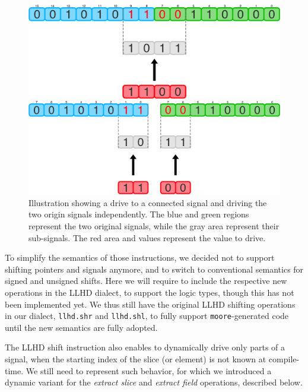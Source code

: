 \begin{figure}[ht]
    \centering
    \begin{minipage}{0.49\textwidth}
        \includegraphics[width=\textwidth]{gfx/DrvConn.png}
    \end{minipage}
    \hfill
    \begin{minipage}{0.49\textwidth}
        \includegraphics[width=\textwidth]{gfx/DrvSplit.png}
    \end{minipage}
    \caption[Driving a connected signal vs. driving the two origin signals independently.]{Illustration showing a drive to a connected signal and driving the two origin signals independently. The blue and green regions represent the two original signals, while the gray area represent their sub-signals. The red area and values represent the value to drive.}
    \label{fig:drvconn}
\end{figure}

To simplify the semantics of those instructions, we decided not to support shifting pointers and signals anymore, and to switch to conventional semantics for signed and unsigned shifts. Here we will require to include the respective new operations in the LLHD dialect, to support the logic types, though this has not been implemented yet. We thus still have the original LLHD shifting operations in our dialect, \texttt{llhd.shr} and \texttt{llhd.shl}, to fully support \texttt{moore}-generated code until the new semantics are fully adopted.

The LLHD shift instruction also enables to dynamically drive only parts of a signal, when the starting index of the slice (or element) is not known at compile-time. We still need to represent such behavior, for which we introduced a dynamic variant for the \textit{extract slice} and \textit{extract field} operations, described below.

